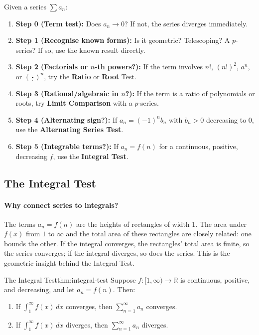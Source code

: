 \begin{examtip}[title={Exam Focus: Which test to try first (decision flowchart)}]
Given a series $\sum a_n$:
\begin{enumerate}[leftmargin=3em]
\item \textbf{Step 0 (Term test):} Does $a_n\to 0$? If not, the series diverges immediately.
\item \textbf{Step 1 (Recognise known forms):} Is it geometric? Telescoping? A $p$-series? If so, use the known result directly.
\item \textbf{Step 2 (Factorials or $n$-th powers?):} If the term involves $n!$, $(n!)^2$, $a^n$, or $\left(\frac{\cdot}{\cdot}\right)^n$, try the \textbf{Ratio} or \textbf{Root} Test.
\item \textbf{Step 3 (Rational/algebraic in $n$?):} If the term is a ratio of polynomials or roots, try \textbf{Limit Comparison} with a $p$-series.
\item \textbf{Step 4 (Alternating sign?):} If $a_n=(-1)^n b_n$ with $b_n>0$ decreasing to $0$, use the \textbf{Alternating Series Test}.
\item \textbf{Step 5 (Integrable terms?):} If $a_n=f(n)$ for a continuous, positive, decreasing $f$, use the \textbf{Integral Test}.
\end{enumerate}
\end{examtip}

\subsection{The Integral Test}

\paragraph{Why connect series to integrals?}
The terms $a_n=f(n)$ are the heights of rectangles of width $1$.
The area under $f(x)$ from $1$ to $\infty$ and the total area of these rectangles are closely related: one bounds the other.
If the integral converges, the rectangles' total area is finite, so the series converges; if the integral diverges, so does the series.
This is the geometric insight behind the Integral Test.

\begin{theorem}{The Integral Test}{thm:integral-test}
Suppose $f:[1,\infty)\to\mathbb{R}$ is continuous, positive, and decreasing, and let $a_n=f(n)$. Then:
\begin{enumerate}[label=(\roman*), leftmargin=3em]
\item If $\displaystyle\int_1^{\infty}f(x)\,dx$ converges, then $\displaystyle\sum_{n=1}^{\infty}a_n$ converges.
\item If $\displaystyle\int_1^{\infty}f(x)\,dx$ diverges, then $\displaystyle\sum_{n=1}^{\infty}a_n$ diverges.
\end{enumerate}
\end{theorem}

